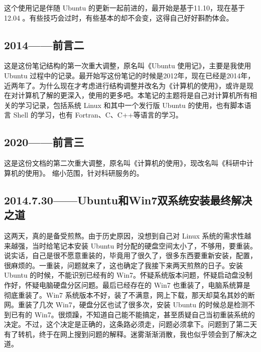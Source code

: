 \documentclass[cn,11pt,chinese,twoside]{elegantbook}
\begin{document}
 这个使用记是伴随 Ubuntu 的更新一起前进的，最开始是基于11.10，现在基于12.04 。有些技巧会过时，有些基本的却不会变，这得自己好好斟酌体会。
 



\subsection*{2014——前言二}
这是这份笔记结构的第一次重大调整，原名叫《Ubuntu 使用记》，主要是我使用 Ubuntu 过程中的记录。最开始写这份笔记的时候是2012年，现在已经是2014年，近两年了。为什么现在才考虑进行结构调整并改名为《计算机的使用》，或许是现在对计算机了解的更深入，使用的更多吧。本笔记的主题将是自己对计算机所有相关的学习记录，包括系统 Linux 和其中一个发行版 Ubuntu 的使用，也有脚本语言 Shell 的学习，也有 Fortran、C、C++等语言的学习。




\subsection*{2020——前言三}
这是这份文档的第二次重大调整，原名叫《计算机的使用》，现改名叫《科研中计算机的使用》。
缩小范围，针对科研服务的。



\subsection*{2014.7.30——Ubuntu和Win7双系统安装最终解决之道}
这两天，真的是备受煎熬。由于历史原因，没想到自己对 Linux 系统的需求性越来越强，当时给笔记本安装 Ubuntu 时分配的硬盘空间太小了，不够用，要重装。说实话，自己是很不愿意重装的，毕竟用了很久了，很多东西要重新安装，配置，很麻烦的。一重装，问题就来了，这也确定了我接下来两天煎熬的日子。安装 Ubuntu 的时候，不能识别已经有的 Win7。怀疑系统版本问题，怀疑启动盘没制作好，怀疑电脑硬盘分区问题。最后已经存在的 Win7 也重装了，电脑系统算是彻底重装了。Win7 系统版本不好，装了不满意，网上下载，那天却莫名其妙的断网。重装了几次 Win7，硬盘分区也试了很多次，安装 Ubuntu 的时候总是检测不到已有的 Win7。很烦躁，不知道自己能不能搞定，甚至质疑自己当初重装系统的决定。不过，这个决定是正确的，这条路必须走，问题必须拿下。问题到了第二天有了转机，终于在网上搜到问题的解释。迷雾渐渐消散，我也似乎领会到了解决之道。
\end{document}
